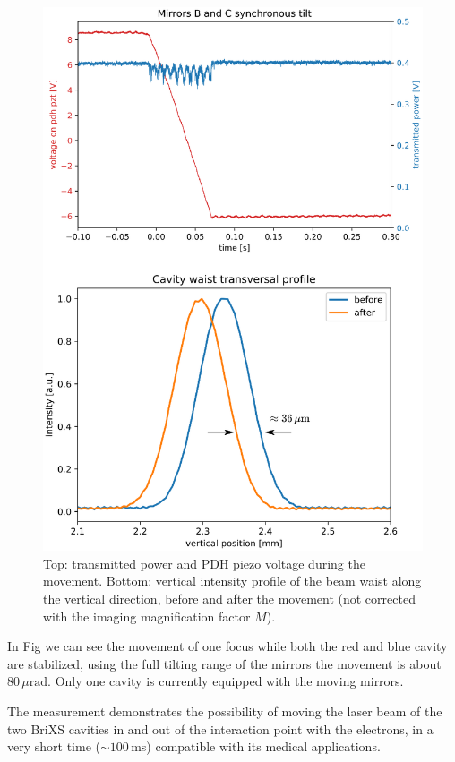 \begin{figure}
	\centering
	\includegraphics[width=0.9\linewidth]{images/tilt.eps}
	\caption{Top: transmitted power and PDH piezo voltage during the movement. Bottom: vertical intensity profile of the beam waist along the vertical direction, before and after the movement (not corrected with the imaging magnification factor $M$).}
	\label{fig:tilt}
\end{figure}

In Fig we can see the movement of one focus while both the red and blue cavity are stabilized, using the full tilting range of the mirrors the movement is about $80\,\mu\mathrm{rad}$. Only one cavity is currently equipped with the moving mirrors.



The measurement demonstrates the possibility of moving the laser beam of the two BriXS cavities in and out of the interaction point with the electrons, in a very short time ($\sim 100\,$ms) compatible with its medical applications.